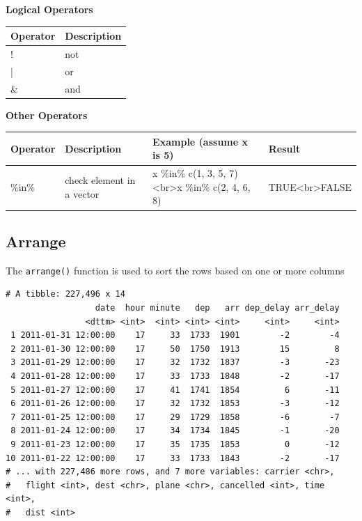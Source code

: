 \documentclass[]{article}
\newenvironment{Shaded}{\begin{snugshade}}{\end{snugshade}}
\newcommand{\KeywordTok}[1]{\textcolor[rgb]{0.13,0.29,0.53}{\textbf{{#1}}}}
\newcommand{\StringTok}[1]{\textcolor[rgb]{0.31,0.60,0.02}{{#1}}}
\newcommand{\NormalTok}[1]{{#1}}
\theoremstyle{definition}
\theoremstyle{definition}
\theoremstyle{definition}
\theoremstyle{remark}
\begin{document}
\textbf{Logical Operators}

\begin{tabular}{l|l}
\hline
Operator & Description\\
\hline
! & not\\
\hline
| & or\\
\hline
\& & and\\
\hline
\end{tabular}

\textbf{Other Operators}

\begin{tabular}{l|l|l|l}
\hline
Operator & Description & Example (assume x is 5) & Result\\
\hline
\%in\% & check element in a vector & x \%in\% c(1, 3, 5, 7)<br>x \%in\% c(2, 4, 6, 8) & TRUE<br>FALSE\\
\hline
\end{tabular}

\subsection{Arrange}\label{arrange}

The \texttt{arrange()} function is used to sort the rows based on one or
more columns

\begin{Shaded}
\end{Shaded}

\begin{verbatim}
# A tibble: 227,496 x 14
                  date  hour minute   dep   arr dep_delay arr_delay
                <dttm> <int>  <int> <int> <int>     <int>     <int>
 1 2011-01-31 12:00:00    17     33  1733  1901        -2        -4
 2 2011-01-30 12:00:00    17     50  1750  1913        15         8
 3 2011-01-29 12:00:00    17     32  1732  1837        -3       -23
 4 2011-01-28 12:00:00    17     33  1733  1848        -2       -17
 5 2011-01-27 12:00:00    17     41  1741  1854         6       -11
 6 2011-01-26 12:00:00    17     32  1732  1853        -3       -12
 7 2011-01-25 12:00:00    17     29  1729  1858        -6        -7
 8 2011-01-24 12:00:00    17     34  1734  1845        -1       -20
 9 2011-01-23 12:00:00    17     35  1735  1853         0       -12
10 2011-01-22 12:00:00    17     33  1733  1843        -2       -17
# ... with 227,486 more rows, and 7 more variables: carrier <chr>,
#   flight <int>, dest <chr>, plane <chr>, cancelled <int>, time <int>,
#   dist <int>
\end{verbatim}
\end{document}
